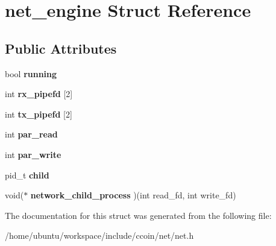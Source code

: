 \hypertarget{structnet__engine}{\section{net\-\_\-engine Struct Reference}
\label{structnet__engine}
}
\subsection*{Public Attributes}
\begin{DoxyCompactItemize}
\item 
\hypertarget{structnet__engine_a805d4aa055cfeed48109c3a061c04ed0}{bool {\bfseries running}}\label{structnet__engine_a805d4aa055cfeed48109c3a061c04ed0}

\item 
\hypertarget{structnet__engine_a379eabeeb5822a6637d73edc1d9d3ccd}{int {\bfseries rx\-\_\-pipefd} \mbox{[}2\mbox{]}}\label{structnet__engine_a379eabeeb5822a6637d73edc1d9d3ccd}

\item 
\hypertarget{structnet__engine_acff2017f985a4af2ece7c5aae8afa4ab}{int {\bfseries tx\-\_\-pipefd} \mbox{[}2\mbox{]}}\label{structnet__engine_acff2017f985a4af2ece7c5aae8afa4ab}

\item 
\hypertarget{structnet__engine_a12a84cab6d9c3802c140723e64c5e6b0}{int {\bfseries par\-\_\-read}}\label{structnet__engine_a12a84cab6d9c3802c140723e64c5e6b0}

\item 
\hypertarget{structnet__engine_a2e7f2c5fb6b5c1257e3f165db5773c4e}{int {\bfseries par\-\_\-write}}\label{structnet__engine_a2e7f2c5fb6b5c1257e3f165db5773c4e}

\item 
\hypertarget{structnet__engine_a80c0804138e43aaca1bed3185357516d}{pid\-\_\-t {\bfseries child}}\label{structnet__engine_a80c0804138e43aaca1bed3185357516d}

\item 
\hypertarget{structnet__engine_a6c7b0e0e8e4cf9813f584e3a34578453}{void($\ast$ {\bfseries network\-\_\-child\-\_\-process} )(int read\-\_\-fd, int write\-\_\-fd)}\label{structnet__engine_a6c7b0e0e8e4cf9813f584e3a34578453}

\end{DoxyCompactItemize}


The documentation for this struct was generated from the following file\-:\begin{DoxyCompactItemize}
\item 
/home/ubuntu/workspace/include/ccoin/net/net.\-h\end{DoxyCompactItemize}
